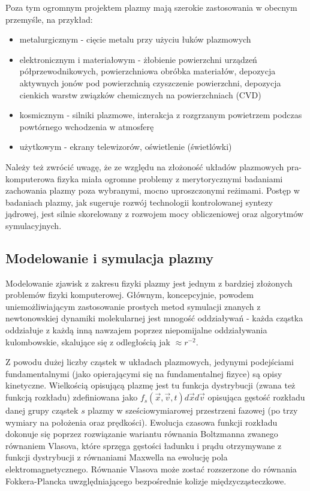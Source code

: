     Poza tym ogromnym projektem plazmy mają szerokie zastosowania w obecnym
    przemyśle, na przykład:
    \begin{itemize}
        \item metalurgicznym - cięcie metalu przy użyciu łuków plazmowych
        \item elektronicznym i materiałowym - żłobienie powierzchni urządzeń
            półprzewodnikowych, powierzchniowa obróbka materiałów, depozycja
            aktywnych jonów pod powierzchnią czyszczenie powierzchni, depozycja
            cienkich warstw związków chemicznych na powierzchniach (CVD)
        \item kosmicznym - silniki plazmowe, interakcja z rozgrzanym powietrzem
            podczas powtórnego wchodzenia w atmosferę 
        \item użytkowym - ekrany telewizorów, oświetlenie (świetlówki)
    \end{itemize}

    Należy też zwrócić uwagę, że ze względu na złożoność układów plazmowych
    pra-komputerowa fizyka miała ogromne problemy z merytorycznymi badaniami
    zachowania plazmy poza wybranymi, mocno uproszczonymi reżimami. Postęp w
    badaniach plazmy, jak sugeruje rozwój technologii kontrolowanej syntezy
    jądrowej, jest silnie skorelowany  z
    rozwojem mocy obliczeniowej oraz algorytmów symulacyjnych.

    \subsection{Modelowanie i symulacja plazmy}

    Modelowanie zjawisk z zakresu fizyki plazmy jest jednym z bardziej
    złożonych problemów fizyki komputerowej.  Głównym, koncepcyjnie, powodem
    uniemożliwiającym zastosowanie prostych metod symulacji znanych z
    newtonowskiej dynamiki molekularnej jest mnogość oddziaływań - każda
    cząstka oddziałuje z każdą inną nawzajem poprzez niepomijalne oddziaływania
    kulombowskie, skalujące się z odległością jak
    $\approx r^{-2}$.

    Z powodu dużej liczby cząstek w układach plazmowych, jedynymi podejściami
    fundamentalnymi (jako opierającymi się na fundamentalnej fizyce) są opisy
    kinetyczne. Wielkością opisującą plazmę jest tu funkcja dystrybucji (zwana
    też funkcją rozkładu) zdefiniowana jako $f_s(\vec{x}, \vec{v}, t) d\vec{x}
    d\vec{v}$ opisująca gęstość rozkładu danej grupy cząstek $s$ plazmy w
    sześciowymiarowej przestrzeni fazowej (po trzy wymiary na położenia oraz
    prędkości). Ewolucja czasowa funkcji rozkładu dokonuje się poprzez
    rozwiązanie wariantu równania Boltzmanna zwanego równaniem Vlasova,
    które sprzęga gęstości ładunku i prądu otrzymywane z funkcji dystrybucji
    z równaniami Maxwella na ewolucję pola elektromagnetycznego. Równanie
    Vlasova może zostać rozszerzone do równania Fokkera-Plancka uwzględniającego
    bezpośrednie kolizje międzycząsteczkowe.



